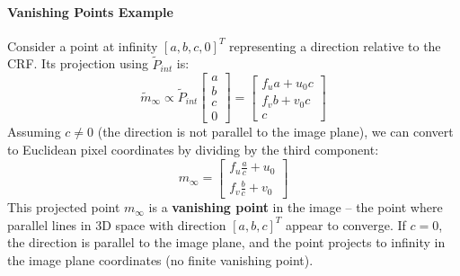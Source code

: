 \documentclass{article}
\begin{document}
\paragraph{Vanishing Points Example}
Consider a point at infinity $[a, b, c, 0]^T$ representing a direction relative to the CRF. Its projection using $\tilde{P}_{int}$ is:
\[
\tilde{m}_{\infty} \propto \tilde{P}_{int}
\begin{bmatrix} a \\ b \\ c \\ 0 \end{bmatrix}
=
\begin{bmatrix}
  f_u a + u_0 c \\
  f_v b + v_0 c \\
  c
\end{bmatrix}
\]
Assuming $c \neq 0$ (the direction is not parallel to the image plane), we can convert to Euclidean pixel coordinates by dividing by the third component:
\[
m_{\infty} = \begin{bmatrix} f_u \frac{a}{c} + u_0 \\ f_v \frac{b}{c} + v_0 \end{bmatrix}
\]
This projected point $m_{\infty}$ is a \textbf{vanishing point} in the image – the point where parallel lines in 3D space with direction $[a, b, c]^T$ appear to converge. If $c=0$, the direction is parallel to the image plane, and the point projects to infinity in the image plane coordinates (no finite vanishing point).
\end{document}
